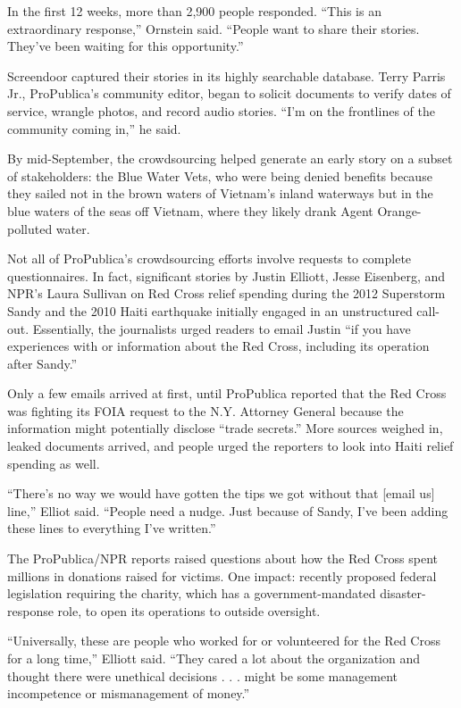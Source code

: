 \begin{itemize}
\begin{itemize}
\begin{enumerate}
{In the first 12 weeks, more than 2,900 people responded. ``This is an extraordinary response,'' Ornstein said. ``People want to share their stories. They’ve been waiting for this opportunity.''

Screendoor captured their stories in its highly searchable database. Terry Parris Jr., ProPublica’s community editor, began to solicit documents to verify dates of service, wrangle photos, and record audio stories. ``I’m on the frontlines of the community coming in,'' he said.\autocite{Parris}

By mid-September, the crowdsourcing helped generate an early story on a subset of stakeholders: the Blue Water Vets, who were being denied benefits because they sailed not in the brown waters of Vietnam’s inland waterways but in the blue waters of the seas off Vietnam, where they likely drank Agent Orange-polluted water.

Not all of ProPublica’s crowdsourcing efforts involve requests to complete questionnaires. In fact, significant stories by Justin Elliott, Jesse Eisenberg, and NPR’s Laura Sullivan on Red Cross relief spending during the 2012 Superstorm Sandy and the 2010 Haiti earthquake initially engaged in an unstructured call-out. Essentially, the journalists urged readers to email Justin ``if you have experiences with or information about the Red Cross, including its operation after Sandy.''

Only a few emails arrived at first, until ProPublica reported that the Red Cross was fighting its FOIA request to the N.Y. Attorney General because the information might potentially disclose ``trade secrets.'' More sources weighed in, leaked documents arrived, and people urged the reporters to look into Haiti relief spending as well.  

``There’s no way we would have gotten the tips we got without that [email us] line,'' Elliot said. ``People need a nudge. Just because of Sandy, I’ve been adding these lines to everything I’ve written.''

The ProPublica/NPR reports raised questions about how the Red Cross spent millions in donations raised for victims. One impact: recently proposed federal legislation requiring the charity, which has a government-mandated disaster-response role, to open its operations to outside oversight.

``Universally, these are people who worked for or volunteered for the Red Cross for a long time,'' Elliott said. ``They cared a lot about the organization and thought there were unethical decisions . . . might be some management incompetence or mismanagement of money.''  

}
\end{enumerate}
\end{itemize}
\end{itemize}
